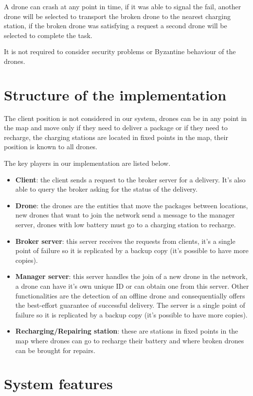 \documentclass[a4paper, oneside]{memoir}
\begin{document}
A drone can crash at any point in time, if it was able to signal the fail, another drone will be selected to transport the broken drone to the nearest charging station, if the broken drone was satisfying a request a second drone will be selected to complete the task.

It is not required to consider security problems or Byzantine behaviour of the drones.


\section{Structure of the implementation}

The client position is not considered in our system, drones can be in any point in the map and move only if they need to deliver a package or if they need to recharge, the charging stations are located in fixed points in the map, their position is known to all drones.

The key players in our implementation are listed below.
\begin{itemize}
\item \textbf{Client}: the client sends a request to the broker server for a delivery. It's also able to query the broker asking for the status of the delivery.
\item \textbf{Drone}: the drones are the entities that move the packages between locations, new drones that want to join the network send a message to the manager server, drones with low battery must go to a charging station to recharge.
\item \textbf{Broker server}: this server receives the requests from clients, it's a single point of failure so it is replicated by a backup copy (it's possible to have more copies).
\item \textbf{Manager server}: this server handles the join of a new drone in the network, a drone can have it's own unique ID or can obtain one from this server. Other functionalities are the detection of an offline drone and consequentially offers the best-effort guarantee of successful delivery. The server is a single point of failure so it is replicated by a backup copy (it's possible to have more copies).
\item \textbf{Recharging/Repairing station}: these are stations in fixed points in the map where drones can go to recharge their battery and where broken drones can be brought for repairs.
\end{itemize}


\section{System features}
\label{System-features}
\end{document}
